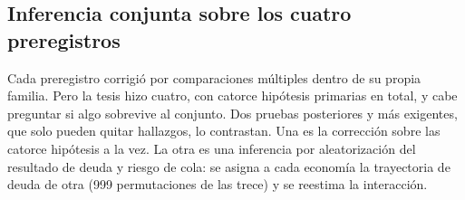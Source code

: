 \subsection{Inferencia conjunta sobre los cuatro preregistros}
\label{sec:inferencia-conjunta}

Cada preregistro corrigió por comparaciones múltiples dentro de su propia familia. Pero la tesis hizo cuatro, con catorce hipótesis primarias en total, y cabe preguntar si algo sobrevive al conjunto. Dos pruebas posteriores y más exigentes, que solo pueden quitar hallazgos, lo contrastan. Una es la corrección sobre las catorce hipótesis a la vez. La otra es una inferencia por aleatorización del resultado de deuda y riesgo de cola: se asigna a cada economía la trayectoria de deuda de otra (999 permutaciones de las trece) y se reestima la interacción.


